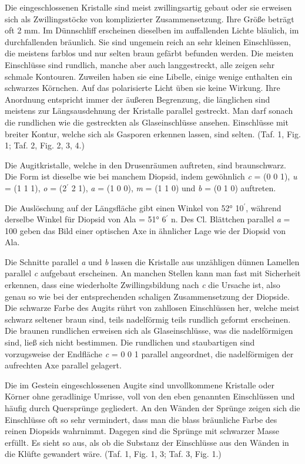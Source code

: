 \documentclass[a4paper, 12pt, oneside]{article}
\begin{document}
Die eingeschlossenen Kristalle sind meist zwillingsartig gebaut oder sie erweisen sich als Zwillingsstöcke von komplizierter Zusammensetzung. Ihre Größe beträgt oft 2 mm. Im Dünnschliff erscheinen dieselben im auffallenden Lichte bläulich, im durchfallenden bräunlich. Sie sind ungemein reich an sehr kleinen Einschlüssen, die meistens farblos und nur selten braun gefärbt befunden werden. Die meisten Einschlüsse sind rundlich, manche aber auch langgestreckt, alle zeigen sehr schmale Kontouren. Zuweilen haben sie eine Libelle, einige wenige enthalten ein schwarzes Körnchen. Auf das polarisierte Licht üben sie keine Wirkung. Ihre Anordnung entspricht immer der äußeren Begrenzung, die länglichen sind meistens zur Längsausdehnung der Kristalle parallel gestreckt. Man darf sonach die rundlichen wie die gestreckten als Glaseinschlüsse ansehen. Einschlüsse mit breiter Kontur, welche sich als Gasporen erkennen lassen, sind selten. (Taf. 1, Fig. 1; Taf. 2, Fig. 2, 3, 4.)

Die Augitkristalle, welche in den Drusenräumen auftreten, sind braunschwarz. Die Form ist dieselbe wie bei manchem Diopsid, indem gewöhnlich \emph{c} = (0 0 1), \emph{u} = (1 1 1), \emph{o} = (2$^{\prime}$ 2 1), \emph{a} = (1 0 0), \emph{m} = (1 1 0) und \emph{b} = (0 1 0) auftreten.

Die Auslöschung auf der Längsfläche gibt einen Winkel von 52° 10$^{\prime}$, während derselbe Winkel für Diopsid von Ala = 51° 6$^{\prime}$ n. Des Cl. Blättchen parallel \emph{a} = 100 geben das Bild einer optischen Axe in ähnlicher Lage wie der Diopsid von Ala.

Die Schnitte parallel \emph{a} und \emph{b} lassen die Kristalle aus unzähligen dünnen Lamellen parallel \emph{c} aufgebaut erscheinen. An manchen Stellen kann man fast mit Sicherheit erkennen, dass eine wiederholte Zwillingsbildung nach \emph{c} die Ursache ist, also genau so wie bei der entsprechenden schaligen Zusammensetzung der Diopside. Die schwarze Farbe des Augits rührt von zahllosen Einschlüssen her, welche meist schwarz seltener braun sind, teils nadelförmig teils rundlich geformt erscheinen. Die braunen rundlichen erweisen sich als Glaseinschlüsse, was die nadelförmigen sind, ließ sich nicht bestimmen. Die rundlichen und staubartigen sind vorzugsweise der Endfläche \emph{c} = 0 0 1 parallel angeordnet, die nadelförmigen der aufrechten Axe parallel gelagert.

Die im Gestein eingeschlossenen Augite sind unvollkommene Kristalle oder Körner ohne geradlinige Umrisse, voll von den eben genannten Einschlüssen und häufig durch Quersprünge gegliedert. An den Wänden der Sprünge zeigen sich die Einschlüsse oft so sehr vermindert, dass man die blass bräunliche Farbe des reinen Diopsids wahrnimmt. Dagegen sind die Sprünge mit schwarzer Masse erfüllt. Es sieht so aus, als ob die Substanz der Einschlüsse aus den Wänden in die Klüfte gewandert wäre. (Taf. 1, Fig. 1, 3; Taf. 3, Fig. 1.)
\end{document}
